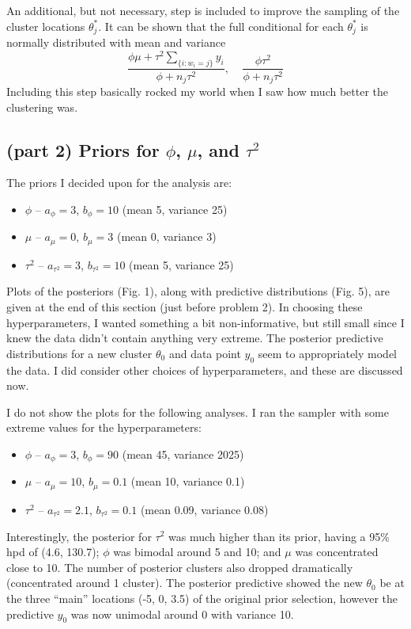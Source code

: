 \documentclass[12pt]{article}
\begin{document}
An additional, but not necessary, step is included to improve the sampling of the cluster locations $\theta_j^*$. It can be shown that the full conditional for each $\theta_j^*$ is normally distributed with mean and variance
\[ \frac{\phi\mu+\tau^2\sum_{\{i:w_i=j\}}y_i}{\phi+n_j\tau^2},~~~~~\frac{\phi\tau^2}{\phi+n_j\tau^2} \]
Including this step basically rocked my world when I saw how much better the clustering was.

\subsection*{(part 2) Priors for $\phi$, $\mu$, and $\tau^2$}

The priors I decided upon for the analysis are:
\begin{itemize}[label=$\cdot$]
\item $\phi$ -- $a_\phi=3$, $b_\phi=10$ (mean 5, variance 25)
\item $\mu$ -- $a_\mu=0$, $b_\mu=3$ (mean 0, variance 3)
\item $\tau^2$ -- $a_{\tau^2}=3$, $b_{\tau^2}=10$ (mean 5, variance 25)
\end{itemize}
Plots of the posteriors (Fig. 1), along with predictive distributions (Fig. 5), are given at the end of this section (just before problem 2). In choosing these hyperparameters, I wanted something a bit non-informative, but still small since I knew the data didn't contain anything very extreme. The posterior predictive distributions for a new cluster $\theta_0$ and data point $y_0$ seem to appropriately model the data. I did consider other choices of hyperparameters, and these are discussed now.

I do not show the plots for the following analyses. I ran the sampler with some extreme values for the hyperparameters:
\begin{itemize}[label=$\cdot$]
\item $\phi$ -- $a_\phi=3$, $b_\phi=90$ (mean 45, variance 2025)
\item $\mu$ -- $a_\mu=10$, $b_\mu=0.1$ (mean 10, variance 0.1)
\item $\tau^2$ -- $a_{\tau^2}=2.1$, $b_{\tau^2}=0.1$ (mean 0.09, variance 0.08)
\end{itemize}
Interestingly, the posterior for $\tau^2$ was much higher than its prior, having a 95\% hpd of (4.6, 130.7); $\phi$ was bimodal around 5 and 10; and $\mu$ was concentrated close to 10. The number of posterior clusters also dropped dramatically (concentrated around 1 cluster). The posterior predictive showed the new $\theta_0$ be at the three ``main'' locations (-5, 0, 3.5) of the original prior selection, however the predictive $y_0$ was now unimodal around 0 with variance 10.
\end{document}
